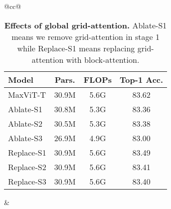 \documentclass[runningheads]{llncs}
\begin{document}
\begin{table*}[!t]
\centering
\setlength{\tabcolsep}{4pt}
\begin{tabular}{@{}cc@{}}
\begin{minipage}[t]{0.48\textwidth}
\centering
\setlength{\tabcolsep}{3pt}
\renewcommand{\arraystretch}{1.08}
\caption{\textbf{Effects of global grid-attention.} Ablate-S1 means we remove grid-attention in stage 1 while Replace-S1 means replacing grid-attention with block-attention.}
\label{tab:ablation-grid-attention}
\begin{tabular}{l|ccc}
Model & Pars. & FLOPs & Top-1 Acc. \\
\toprule
MaxViT-T & 30.9M & 5.6G & 83.62 \\\hline
 Ablate-S1 & 30.8M & 5.3G & 83.36\scriptsize\color{gray}{(-0.26)} \\
 Ablate-S2 & 30.5M & 5.3G & 83.38\scriptsize\color{gray}{(-0.24)}\\
 Ablate-S3 & 26.9M & 4.9G & 83.00\scriptsize\color{gray}{(-0.62)}\\\hline
 Replace-S1 & 30.9M & 5.6G & 83.49\scriptsize\color{gray}{(-0.13)}\\
 Replace-S2 & 30.9M & 5.6G & 83.41\scriptsize\color{gray}{(-0.22)}\\
 Replace-S3 & 30.9M & 5.6G & 83.40\scriptsize\color{gray}{(-0.23)}\\
\end{tabular}
\end{minipage}&



\end{tabular}
\end{table*}
\end{document}
